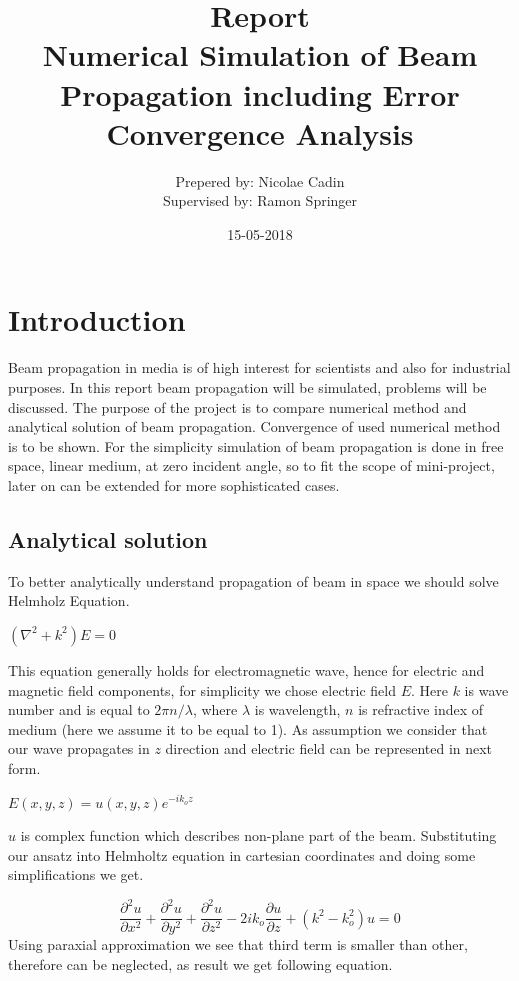 \documentclass{article}
\title{Report\\Numerical Simulation of Beam Propagation including Error Convergence Analysis}
\date{15-05-2018}
\author{Prepered by: Nicolae Cadin \\Supervised by: Ramon Springer}
\begin{document}
	
	
	\maketitle
	\newpage
	\tableofcontents
	
	\newpage
	\section{Introduction}
	Beam propagation in media is of high interest for scientists and also for industrial purposes. 
	In this report beam propagation will be simulated, problems will be discussed. The purpose of the project is to compare numerical method and analytical solution of beam propagation. Convergence of used numerical method is to be shown. For the simplicity simulation of beam propagation is done in free space, linear medium, at zero incident angle, so to fit the scope of mini-project, later on can be extended for more sophisticated cases.
	\subsection{Analytical solution}
	To better analytically understand propagation of beam in space we should solve Helmholz Equation.
	\begin{center}
		$(\nabla^2+k^2)E = 0$		
	\end{center}
	This equation generally holds for electromagnetic wave, hence for electric and magnetic field components, for simplicity we chose electric field $E$. Here $k$ is wave number and is equal to $2\pi n/\lambda$, where $\lambda$ is wavelength, $n$ is refractive index of medium (here we assume it to be equal to 1). As assumption we consider that our wave propagates in $z$ direction and electric field can be represented in next form.
	\begin{center}
		$E(x,y,z)=u(x,y,z)e^{-ik_oz}$
	\end{center}
	$u$ is complex function which describes non-plane part of the beam. Substituting our ansatz into Helmholtz equation in cartesian coordinates and doing some simplifications we get.

	\[\frac{\partial^2 u}{\partial x^2}+ \frac{\partial^2 u}{\partial y^2}+ \frac{\partial^2 u}{\partial z^2} - 2ik_o\frac{\partial u}{\partial z}+(k^2-k_o^2)u=0\]
	Using paraxial approximation we see that third term is smaller than other, therefore can be neglected, as result we get following equation.
	
\end{document}
